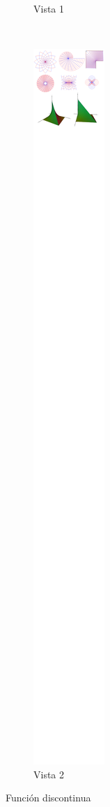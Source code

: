 \begin{figure}[t!]
\begin{subfigure}[t]{0.5\textwidth}
\caption{Vista 1}
\end{subfigure}%
~
\begin{subfigure}[t]{0.5\textwidth}
\centering
\includegraphics[scale=0.4,trim={566px 9132px 68px 614px},clip]{images/04_analisis2/am2.png}
\caption{Vista 2}
\end{subfigure}
	
\caption{Función discontinua} \label{fig:discont}
\end{figure}


